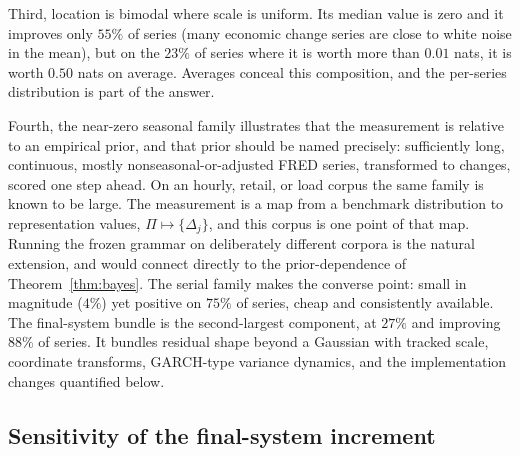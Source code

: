 \documentclass[11pt]{article}
\theoremstyle{remark}
\begin{document}
Third, location is bimodal where scale is uniform. Its median value is zero and it improves
only $55\%$ of series (many economic change series are close to white noise in the mean),
but on the $23\%$ of series where it is worth more than $0.01$ nats, it is worth $0.50$ nats on
average. Averages conceal this composition, and the per-series distribution is part of the
answer.

Fourth, the near-zero seasonal family illustrates that the measurement is relative to an
empirical prior, and that prior should be named precisely: sufficiently long, continuous,
mostly nonseasonal-or-adjusted FRED series, transformed to changes, scored one step ahead. On
an hourly, retail, or load corpus the same family is known to be large. The measurement is a map from a benchmark distribution to representation values,
$\Pi\mapsto\{\Delta_j\}$, and this corpus is one point of that map. Running the frozen
grammar on deliberately different corpora is the natural extension, and would connect
directly to the prior-dependence of Theorem~\ref{thm:bayes}. The serial family makes the converse point: small in magnitude ($4\%$)
yet positive on $75\%$ of series, cheap and consistently available. The final-system bundle is the second-largest component, at $27\%$ and improving $88\%$
of series. It bundles residual shape beyond a Gaussian with tracked scale, coordinate
transforms, GARCH-type variance dynamics, and the implementation changes quantified below.

\subsection*{Sensitivity of the final-system increment}
\end{document}
